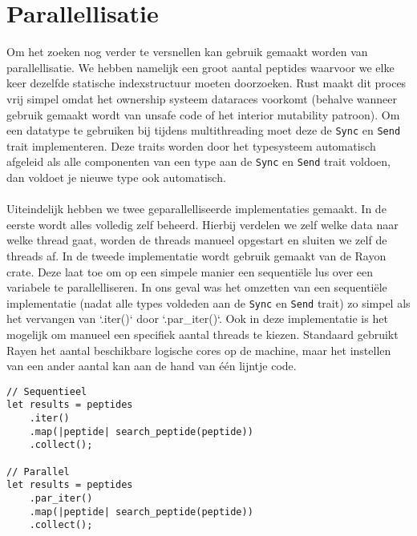 \section{Parallellisatie}\label{sec:parallellisatie}
Om het zoeken nog verder te versnellen kan gebruik gemaakt worden van parallellisatie.
We hebben namelijk een groot aantal peptides waarvoor we elke keer dezelfde statische indexstructuur moeten doorzoeken.
Rust maakt dit proces vrij simpel omdat het ownership systeem dataraces voorkomt (behalve wanneer gebruik gemaakt wordt van unsafe code of het interior mutability patroon)\cite{rust_data_races}.
Om een datatype te gebruiken bij tijdens multithreading moet deze de \texttt{Sync} en \texttt{Send} trait implementeren.
Deze traits worden door het typesysteem automatisch afgeleid als alle componenten van een type aan de \texttt{Sync} en \texttt{Send} trait voldoen, dan voldoet je nieuwe type ook automatisch. %
\\ \\
Uiteindelijk hebben we twee geparallelliseerde implementaties gemaakt.
In de eerste wordt alles volledig zelf beheerd.
Hierbij verdelen we zelf welke data naar welke thread gaat, worden de threads manueel opgestart en sluiten we zelf de threads af.
In de tweede implementatie wordt gebruik gemaakt van de Rayon crate\cite{rayon}.
Deze laat toe om op een simpele manier een sequentiële lus over een variabele te parallelliseren.
In ons geval was het omzetten van een sequentiële implementatie (nadat alle types voldeden aan de \texttt{Sync} en \texttt{Send} trait) zo simpel als het vervangen van `.iter()` door `.par\_iter()`.
Ook in deze implementatie is het mogelijk om manueel een specifiek aantal threads te kiezen.
Standaard gebruikt Rayen het aantal beschikbare logische cores op de machine, maar het instellen van een ander aantal kan aan de hand van één lijntje code.

\begin{verbatim}
// Sequentieel
let results = peptides
    .iter()
    .map(|peptide| search_peptide(peptide))
    .collect();

// Parallel
let results = peptides
    .par_iter()
    .map(|peptide| search_peptide(peptide))
    .collect();
\end{verbatim}

